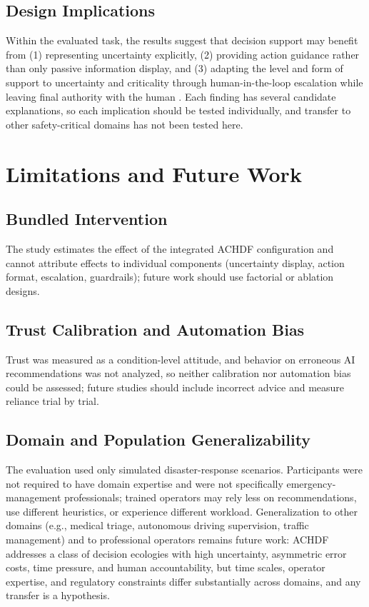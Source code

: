 \documentclass[journal]{IEEEtran}
\theoremstyle{plain}
\theoremstyle{definition}
\begin{document}
\subsection{Design Implications}
Within the evaluated task, the results suggest that decision support may benefit from (1) representing uncertainty explicitly, (2) providing action guidance rather than only passive information display, and (3) adapting the level and form of support to uncertainty and criticality through human-in-the-loop escalation while leaving final authority with the human \cite{Assaad2023TAS,Zhang2022THMS,Bach2024Access,Parasuraman2000LOA}. Each finding has several candidate explanations, so each implication should be tested individually, and transfer to other safety-critical domains \cite{PerezCerrolaza2024CSUR} has not been tested here.

    \section{Limitations and Future Work}
    \label{sec:limitations}

    \subsection{Bundled Intervention}
    The study estimates the effect of the integrated ACHDF configuration and cannot attribute effects to individual components (uncertainty display, action format, escalation, guardrails); future work should use factorial or ablation designs.

    \subsection{Trust Calibration and Automation Bias}
    Trust was measured as a condition-level attitude, and behavior on erroneous AI recommendations was not analyzed, so neither calibration nor automation bias could be assessed; future studies should include incorrect advice and measure reliance trial by trial.

    \subsection{Domain and Population Generalizability}
    The evaluation used only simulated disaster-response scenarios. Participants were not required to have domain expertise and were not specifically emergency-management professionals; trained operators may rely less on recommendations, use different heuristics, or experience different workload. Generalization to other domains (e.g., medical triage, autonomous driving supervision, traffic management) and to professional operators remains future work: ACHDF addresses a class of decision ecologies with high uncertainty, asymmetric error costs, time pressure, and human accountability, but time scales, operator expertise, and regulatory constraints differ substantially across domains, and any transfer is a hypothesis.
\end{document}
